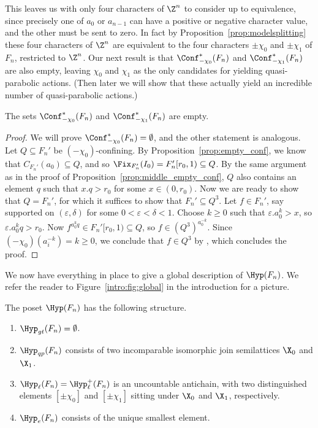 This leaves us with only four characters of $\Z^n$ to consider up to equivalence, since precisely one of $a_0$ or $a_{n-1}$ can have a positive or negative character value, and the other must be sent to zero. In fact by Proposition~\ref{prop:modelsplitting} these four characters of $\Z^n$ are equivalent to the four characters $\pm\chi_0$ and $\pm\chi_1$ of $F_n$, restricted to $\Z^n$. Our next result is that $\Conf^\ast_{-\chi_0}(F_n)$ and $\Conf^\ast_{-\chi_1}(F_n)$ are also empty, leaving $\chi_0$ and $\chi_1$ as the only candidates for yielding quasi-parabolic actions. (Then later we will show that these actually yield an incredible number of quasi-parabolic actions.)

\begin{prop}\label{prop:last_empty_conf}
The sets $\Conf^\ast_{-\chi_0}(F_n)$ and $\Conf^\ast_{-\chi_1}(F_n)$ are empty.
\end{prop}

\begin{proof}
We will prove $\Conf^\ast_{-\chi_0}(F_n)=\emptyset$, and the other statement is analogous. Let $Q\subseteq F_n'$ be $(-\chi_0)$-confining. By Proposition~\ref{prop:empty_conf}, we know that $C_{F_n'}(a_0) \subseteq Q$, and so $\Fix_{F_n'}(I_0)=F_n'[r_0,1)\subseteq Q$. By the same argument as in the proof of Proposition~\ref{prop:middle_empty_conf}, $Q$ also contains an element $q$ such that $x.q>r_0$ for some $x\in (0,r_0)$. Now we are ready to show that $Q=F_n'$, for which it suffices to show that $F_n' \subseteq Q^3$. Let $f\in F_n'$, say supported on $(\varepsilon,\delta)$ for some $0<\varepsilon<\delta<1$. Choose $k\ge 0$ such that $\varepsilon.a_0^k>x$, so $\varepsilon.a_0^k q > r_0$. Now $f^{a_0^k q}\in F_n'[r_0,1)\subseteq Q$, so $f\in (Q^3)^{a_0^{-k}}$. Since $(-\chi_0)(a_i^{-k})=k\ge 0$, we conclude that $f\in Q^3$ by \StayInConf, which concludes the proof.
\end{proof}

We now have everything in place to give a global description of $\Hyp(F_n)$. We refer the reader to Figure~\ref{intro:fig:global} in the introduction for a picture.

\begin{theo}\label{thm:global}
The poset $\Hyp(F_n)$ has the following structure.
\begin{enumerate}
   \item $\Hyp_{gt}(F_n) = \emptyset$.
   \item $\Hyp_{qp}(F_n)$ consists of two incomparable isomorphic join semilattices $\X_0$ and $\X_1$.
   \item $\Hyp_{\ell}(F_n) = \Hyp_{\ell}^+(F_n)$ is an uncountable antichain, with two distinguished elements $[\pm\chi_0]$ and $[\pm\chi_1]$ sitting under $\X_0$ and $\X_1$, respectively.
   \item $\Hyp_e(F_n)$ consists of the unique smallest element.
\end{enumerate}
\end{theo}

